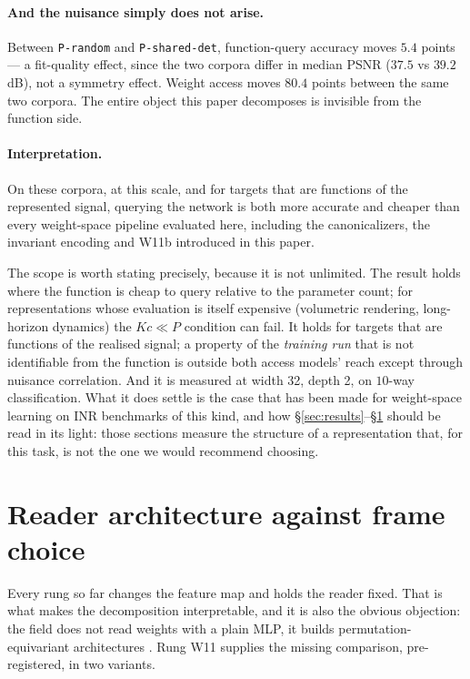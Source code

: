 \documentclass[10pt,letterpaper]{article}
\theoremstyle{definition}
\begin{document}
\paragraph{And the nuisance simply does not arise.} Between \texttt{P-random} and
\texttt{P-shared-det}, function-query accuracy moves $5.4$ points --- a fit-quality effect, since the
two corpora differ in median PSNR ($37.5$ vs $39.2$\,dB), not a symmetry effect. Weight access moves
$\mathbf{80.4}$ points between the same two corpora. The entire object this paper decomposes is
invisible from the function side.

\paragraph{Interpretation.} On these corpora, at this scale, and for targets that are functions
of the represented signal, querying the network is both more accurate and cheaper than every
weight-space pipeline evaluated here, including the canonicalizers, the invariant encoding and
W11b introduced in this paper.

The scope is worth stating precisely, because it is not unlimited. The result holds where the
function is cheap to query relative to the parameter count; for representations whose evaluation is
itself expensive (volumetric rendering, long-horizon dynamics) the $Kc \ll P$ condition can fail. It
holds for targets that are functions of the realised signal; a property of the \emph{training run}
that is not identifiable from the function is outside both access models' reach except through
nuisance correlation. And it is measured at width 32, depth 2, on $10$-way classification. What it
does settle is the case that has been made for weight-space learning on INR benchmarks of this kind,
and how \S\ref{sec:results}--\S\ref{sec:w11} should be read in its light: those sections measure
the structure of a representation that, for this task, is not the one we would recommend choosing.

\section{Reader architecture against frame choice}\label{sec:w11}

Every rung so far changes the feature map and holds the reader fixed. That is what makes the
decomposition interpretable, and it is also the obvious objection: the field does not read weights
with a plain MLP, it builds permutation-equivariant architectures
\citep{navon2023dws,zhou2023nfn,lim2024gmn,kofinas2024graph,tran2024monomial}. Rung W11 supplies
the missing comparison, pre-registered, in two variants.
\end{document}

